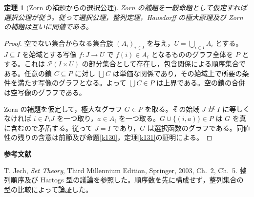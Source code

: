 \documentclass[a5paper,10pt,dvipdfmx]{jsarticle}
\theoremstyle{definition}
\theoremstyle{plain}
\newtheorem{thm}[ruledef]{定理}
\newcommand{\Pow}{\mathcal{P}}
\begin{document}
\begin{thm}[Zorn の補題からの選択公理]\label{k132}
Zorn の補題を一般命題として仮定すれば選択公理が従う。従って選択公理，整列定理，Hausdorff の極大原理及び Zorn の補題は互いに同値である。
\end{thm}
\begin{proof}
空でない集合からなる集合族 $(A_i)_{i\in I}$ を与え，$U=\bigcup_{i\in I}A_i$ とする。$J\subseteq I$ を始域とする写像 $f\colon J\to U$ で $f(i)\in A_i$ となるもののグラフ全体を $P$ とする。これは $\Pow(I\times U)$ の部分集合として存在し，包含関係による順序集合である。任意の鎖 $C\subseteq P$ に対し $\bigcup C$ は単価な関係であり，その始域上で所要の条件を満たす写像のグラフとなる。よって $\bigcup C\in P$ は上界である。空の鎖の合併は空写像のグラフである。

Zorn の補題を仮定して，極大なグラフ $G\in P$ を取る。その始域 $J$ が $I$ に等しくなければ $i\in I\setminus J$ を一つ取り，$a\in A_i$ を一つ取る。$G\cup\{(i,a)\}\in P$ は $G$ を真に含むので矛盾する。従って $J=I$ であり，$G$ は選択函数のグラフである。同値性の残りの含意は前節及び命題\ref{k130}，定理\ref{k131}の証明による。
\end{proof}
\par\medskip\noindent\textbf{参考文献}\par\smallskip
\noindent T. Jech, \textit{Set Theory}, Third Millennium Edition, Springer, 2003, Ch.~2, Ch.~5. 整列順序及び Hartogs 型の議論を参照した。順序数を先に構成せず，整列集合の型の比較によって論証した。
\end{document}

